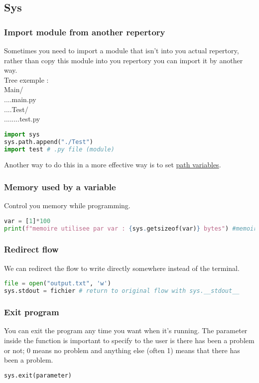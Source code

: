 \documentclass[a4paper, 12pt, titlepage]{scrartcl} %
\begin{document}
\subsection{Sys}
\subsubsection{Import module from another repertory}
Sometimes you need to import a module that isn't into you actual repertory, rather than copy this module into you repertory you can import it by another way. \\

Tree exemple : \\
Main/ \\
....main.py \\
....Test/ \\
........test.py \\

\begin{lstlisting}[language=Python]
import sys
sys.path.append("./Test")
import test # .py file (module)
\end{lstlisting}

Another way to do this in a more effective way is to set \hyperref[subsec:PathVariables]{path variables}.

\subsubsection{Memory used by a variable}
Control you memory while programming. 
\begin{lstlisting}[language=Python]
var = [1]*100
print(f"memoire utilisee par var : {sys.getsizeof(var)} bytes") #memoire utilisee par var : 856 bytes
\end{lstlisting}

\subsubsection{Redirect flow}
We can redirect the flow to write directly somewhere instead of the terminal.
\begin{lstlisting}[language=Python]
file = open("output.txt", 'w')
sys.stdout = fichier # return to original flow with sys.__stdout__
\end{lstlisting}

\subsubsection{Exit program}
You can exit the program any time you want when it's running. The parameter inside the function is important to specify to the user is there has been a problem or not; 0 means no problem and anything else (often 1) means that there has been a problem.
\begin{lstlisting}[language=Python]
sys.exit(parameter)
\end{lstlisting}
\end{document}
